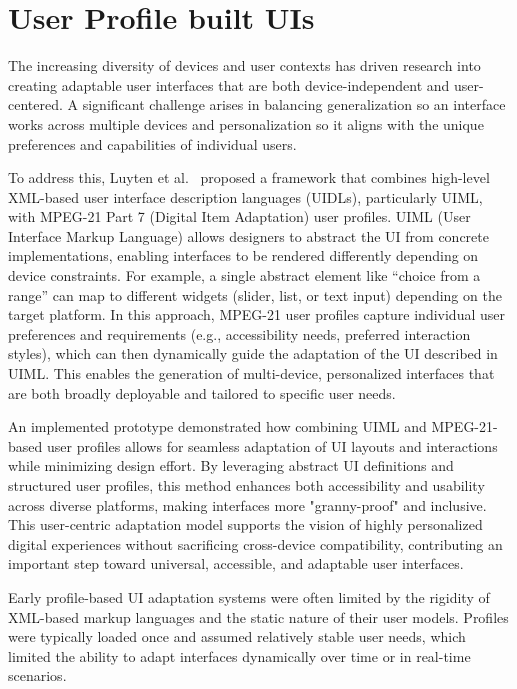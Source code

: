 \documentclass[openany]{book}
\begin{document}

\section{User Profile built UIs}
The increasing diversity of devices and user contexts has driven research into creating adaptable user interfaces that are both device-independent and user-centered. A significant challenge arises in balancing generalization so an interface works across multiple devices and personalization so it aligns with the unique preferences and capabilities of individual users.

To address this, Luyten et al.~\cite{luyten2005profile} proposed a framework that combines high-level XML-based user interface description languages (UIDLs), particularly UIML, with MPEG-21 Part 7 (Digital Item Adaptation) user profiles. UIML (User Interface Markup Language) allows designers to abstract the UI from concrete implementations, enabling interfaces to be rendered differently depending on device constraints. For example, a single abstract element like “choice from a range” can map to different widgets (slider, list, or text input) depending on the target platform. In this approach, MPEG-21 user profiles capture individual user preferences and requirements (e.g., accessibility needs, preferred interaction styles), which can then dynamically guide the adaptation of the UI described in UIML. This enables the generation of multi-device, personalized interfaces that are both broadly deployable and tailored to specific user needs.

An implemented prototype demonstrated how combining UIML and MPEG-21-based user profiles allows for seamless adaptation of UI layouts and interactions while minimizing design effort. By leveraging abstract UI definitions and structured user profiles, this method enhances both accessibility and usability across diverse platforms, making interfaces more "granny-proof" and inclusive. This user-centric adaptation model supports the vision of highly personalized digital experiences without sacrificing cross-device compatibility, contributing an important step toward universal, accessible, and adaptable user interfaces.

Early profile-based UI adaptation systems were often limited by the rigidity of XML-based markup languages and the static nature of their user models. Profiles were typically loaded once and assumed relatively stable user needs, which limited the ability to adapt interfaces dynamically over time or in real-time scenarios.
\end{document}
